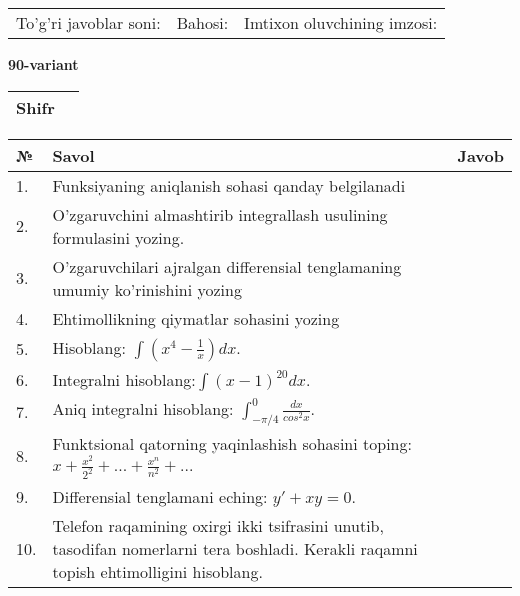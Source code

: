 \documentclass{article}
\begin{document}
  \vspace{1cm}
  
  \begin{tabular}{lll}
  To'g'ri javoblar soni: \underline{\hspace{1.5cm}} & 
  Bahosi: \underline{\hspace{1.5cm}} & 
  Imtixon oluvchining imzosi: \underline{\hspace{2cm}} \\
  \end{tabular}
  
  \egroup
  
  \newpage
  
  
  \textbf{90-variant}\\
  
  \bgroup
  \def\arraystretch{1.6} %
  
  \begin{tabular}{|m{5.7cm}|m{9.5cm}|}
  \hline
  Shifr & \\
  \hline
  \end{tabular}
  
  \vspace{1cm}
  
  \begin{tabular}{|m{0.7cm}|m{10cm}|m{4cm}|}
  \hline
  № & Savol & Javob \\
  \hline
  1. & Funksiyaning aniqlanish sohasi qanday belgilanadi &  \\
  \hline
  2. & O'zgaruvchini almashtirib integrallash usulining formulasini yozing. &  \\
  \hline
  3. & O'zgaruvchilari ajralgan differensial tenglamaning umumiy ko'rinishini yozing &  \\
  \hline
  4. & Ehtimollikning qiymatlar sohasini yozing &  \\
  \hline
  5. & Hisoblang: \(\int \left( x^{4} - \frac{1}{x} \right)dx\). &  \\
  \hline
  6. & Integralni hisoblang:\(\int {(x - 1)^{20}}dx\). &  \\
  \hline
  7. & Aniq integralni hisoblang: \(\int_{- \pi/4}^{0}\frac{dx}{cos^{2}x}\). &  \\
  \hline
  8. & Funktsional qatorning yaqinlashish sohasini toping: \(x + \frac{x^{2}}{2^{2}} + ... + \frac{x^{n}}{n^{2}} + ...\) &  \\
  \hline
  9. & Differensial tenglamani eching: \(y' + xy = 0\). &  \\
  \hline
  10. & Telefon raqamining oxirgi ikki tsifrasini unutib, tasodifan nomerlarni tera boshladi. Kerakli raqamni topish ehtimolligini hisoblang. &  \\
  \hline
  \end{tabular}
  
\end{document}
